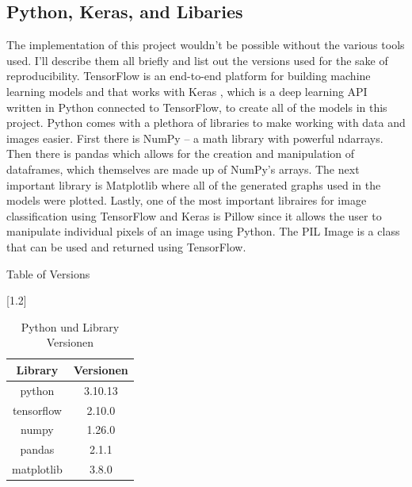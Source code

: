 \documentclass[12pt]{article}
\begin{document}
        \subsection{Python, Keras, and Libaries}
                
            The implementation of this project wouldn’t be possible without the various tools used. 
            I’ll describe them all briefly and list out the versions used for the sake of reproducibility. 
            TensorFlow \cite{abadi2016-tensorflow} is an end-to-end platform for building machine learning models 
            and that works with Keras \cite{chollet2015-keras}, which is a deep learning API written in Python connected to TensorFlow, 
            to create all of the models in this project. 
            Python comes with a plethora of libraries to make working with data and images easier. 
            First there is NumPy \cite{harris2020-numpy} -- a math library with powerful ndarrays. 
            Then there is pandas \cite{reback2020-pandas} \cite{mckinney2010-pandas} 
            which allows for the creation and manipulation of dataframes, which themselves are made up of NumPy’s arrays. 
            The next important library is Matplotlib \cite{hunter2007-matplotlib} 
            where all of the generated graphs used in the models were plotted. 
            Lastly, one of the most important libraires for image classification using TensorFlow 
            and Keras is Pillow \cite{clark2015pillow} since it allows the user to manipulate individual pixels of an image using Python. 
            The PIL Image is a class that can be used and returned using TensorFlow.

            Table of Versions
        
        
                
            \begin{table}[htp]

                \begin{center} 

                \scalebox{1.2}[1.2]{
                \begin{tabular}{ | c | c | }
                \hline
                \textbf{Library}    &       \textbf{Versionen} \\
                \hline
                python              &       3.10.13 \\ 
                tensorflow          &       2.10.0 \\
                numpy               &       1.26.0 \\
                pandas              &       2.1.1 \\
                matplotlib          &       3.8.0 \\
                
                \hline
                \end{tabular}
                }

                \caption{Python und Library Versionen}
                \label{pl-versionen}

                \end{center}

            \end{table}
       
\end{document}
